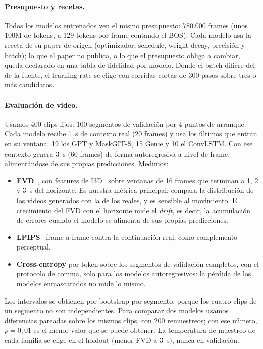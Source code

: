 \documentclass[10pt,twocolumn,a4paper]{article}
\DeclareRobustCommand{\editado}[1]{\textcolor{editado}{#1}}
\DeclareRobustCommand{\editado}[1]{#1}
\begin{document}
\paragraph{Presupuesto y recetas.} Todos los modelos entrenados ven el mismo presupuesto: 780.000 frames (unos 100M de tokens, a 129 tokens por frame contando el BOS). Cada modelo usa la receta de su paper de origen (optimizador, schedule, weight decay, precisión y batch); lo que el paper no publica, o lo que el presupuesto obliga a cambiar, queda declarado en una tabla de fidelidad por modelo. Donde el batch difiere del de la fuente, el learning rate se elige con corridas cortas de 300 pasos sobre tres o más candidatos.

\paragraph{Evaluación de video.} Usamos 400 clips fijos: 100 segmentos de validación por 4 puntos de arranque. Cada modelo recibe 1~s de contexto real (20 frames) \editado{y usa los últimos que entran en su ventana: 19 los GPT y MaskGIT-S, 15 Genie y 10 el ConvLSTM. Con ese contexto} genera 3~s (60 frames) de forma autoregresiva a nivel de frame, alimentándose de sus propias predicciones. Medimos:
\begin{itemize}
  \item \textbf{FVD}~\cite{unterthiner2018fvd}, con features de I3D~\cite{carreira2017i3d} sobre ventanas de 16 frames que terminan a 1, 2 y 3~s del horizonte. Es nuestra métrica principal: compara la distribución de los videos generados con la de los reales, y es sensible al movimiento. El crecimiento del FVD con el horizonte mide el \emph{drift}, es decir, la acumulación de errores cuando el modelo se alimenta de sus propias predicciones.
  \item \textbf{LPIPS}~\cite{zhang2018lpips} frame a frame contra la continuación real, como complemento perceptual.
  \item \textbf{Cross-entropy} por token sobre los segmentos de validación completos, con el protocolo de comma, solo para los modelos autoregresivos: la pérdida de los modelos enmascarados no mide lo mismo.
\end{itemize}
Los intervalos se obtienen por bootstrap por segmento, porque los cuatro clips de un segmento no son independientes. \editado{Para comparar dos modelos usamos diferencias pareadas sobre los mismos clips, con 200 remuestreos; con ese número, $p=0{,}01$ es el menor valor que se puede obtener.} La temperatura de muestreo de cada familia se elige en el holdout (menor FVD a 3~s), nunca en validación.
\end{document}
